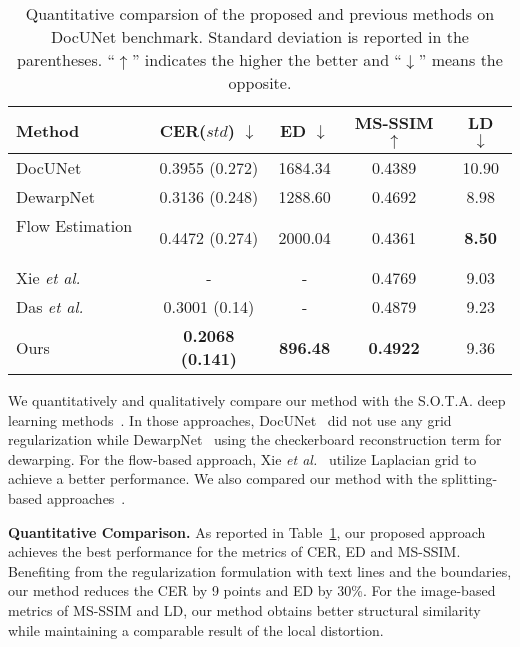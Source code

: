 \documentclass[10pt,twocolumn,letterpaper]{article}
\newcommand{\myparagraph}[1]{\vspace{1pt} \noindent \textbf{#1} }
\begin{document}
\begin{table}[!t]
  \centering
  \scriptsize
   \caption{Quantitative comparsion of the proposed and previous methods on DocUNet benchmark. Standard deviation is reported in the parentheses. ``$\uparrow$'' indicates the higher the better and ``$\downarrow$'' means the opposite.}
   \vspace{-3mm}
  \begin{tabular}{lcccc}
    \toprule
    \textbf{Method} &  \textbf{CER}($std$) $\downarrow$ & \textbf{ED} $\downarrow$ &\textbf{MS-SSIM} $\uparrow$ & \textbf{LD} $\downarrow$\\
    \midrule
    DocUNet~\cite{Ma_2018_CVPR} & 0.3955 (0.272) & 1684.34  & 0.4389 & 10.90\\
    DewarpNet~\cite{Das_2019_ICCV} & 0.3136 (0.248) & 1288.60 & 0.4692 & 8.98\\  
    Flow Estimation ~\cite{xie2020dewarping} & 0.4472 (0.274) & 2000.04 & 0.4361 & \textbf{8.50} \\ 
    Xie {\em et al.} ~\cite{xie2021document} & -& - &0.4769 & 9.03\\ 
    Das {\em et al.} ~\cite{das2021end} & 0.3001 (0.14) & - & 0.4879 & 9.23\\
    Ours & \textbf{0.2068 (0.141)} & \textbf{896.48} & \textbf{0.4922} & 9.36\\ 
    \bottomrule
  \end{tabular}
  \label{tab:result}
    \vspace{1em}
\end{table}

We quantitatively and qualitatively compare our method with the S.O.T.A. deep learning methods~\cite{Ma_2018_CVPR,Das_2019_ICCV,xie2021document,li2019document,das2021end}. In those approaches, DocUNet~\cite{Ma_2018_CVPR} did not use any grid regularization while DewarpNet~\cite{Das_2019_ICCV} using the checkerboard reconstruction term for dewarping. 
For the flow-based approach, Xie {\em et al.}~\cite{xie2021document} utilize Laplacian grid to achieve a better performance. We also compared our method with the splitting-based approaches~\cite{li2019document,das2021end}.




\myparagraph{Quantitative Comparison.} 
As reported in Table~\ref{tab:result}, our proposed approach achieves the best performance for the metrics of CER, ED and MS-SSIM. Benefiting from the regularization formulation with text lines and the boundaries, our method reduces the CER by 9 points and ED by 30\%. For the image-based metrics of MS-SSIM and LD, our method obtains better structural similarity while maintaining a comparable result of the local distortion.
\end{document}
